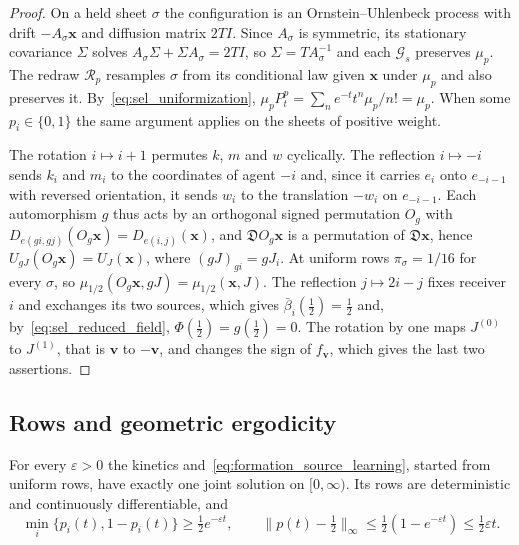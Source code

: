 \begin{proof}
On a held sheet $\sigma$ the configuration is an Ornstein--Uhlenbeck process with drift $-A_\sigma\mathbf x$ and diffusion matrix $2TI$. Since $A_\sigma$ is symmetric, its stationary covariance $\Sigma$ solves $A_\sigma\Sigma+\Sigma A_\sigma=2TI$, so $\Sigma=TA_\sigma^{-1}$ and each $\mathcal G_s$ preserves $\mu_p$. The redraw $\mathcal R_p$ resamples $\sigma$ from its conditional law given $\mathbf x$ under $\mu_p$ and also preserves it. By~\eqref{eq:sel_uniformization}, $\mu_pP^p_t=\sum_ne^{-t}t^n\mu_p/n!=\mu_p$. When some $p_i\in\{0,1\}$ the same argument applies on the sheets of positive weight.

The rotation $i\mapsto i+1$ permutes $k$, $m$ and $w$ cyclically. The reflection $i\mapsto-i$ sends $k_i$ and $m_i$ to the coordinates of agent $-i$ and, since it carries $e_i$ onto $e_{-i-1}$ with reversed orientation, it sends $w_i$ to the translation $-w_i$ on $e_{-i-1}$. Each automorphism $g$ thus acts by an orthogonal signed permutation $O_g$ with $D_{e(gi,gj)}(O_g\mathbf x)=D_{e(i,j)}(\mathbf x)$, and $\mathfrak DO_g\mathbf x$ is a permutation of $\mathfrak D\mathbf x$, hence $U_{gJ}(O_g\mathbf x)=U_J(\mathbf x)$, where $(gJ)_{gi}=gJ_i$. At uniform rows $\pi_\sigma=1/16$ for every $\sigma$, so $\mu_{1/2}(O_g\mathbf x,gJ)=\mu_{1/2}(\mathbf x,J)$. The reflection $j\mapsto2i-j$ fixes receiver $i$ and exchanges its two sources, which gives $\bar\beta_i(\frac12)=\frac12$ and, by~\eqref{eq:sel_reduced_field}, $\Phi(\frac12)=g(\frac12)=0$. The rotation by one maps $J^{(0)}$ to $J^{(1)}$, that is $\mathbf v$ to $-\mathbf v$, and changes the sign of $f_{\mathbf v}$, which gives the last two assertions.
\end{proof}

\subsection{Rows and geometric ergodicity}\label{app:sel_rows}

\begin{lemma}\label{lem:sel_rows}
For every $\varepsilon>0$ the kinetics and~\eqref{eq:formation_source_learning}, started from uniform rows, have exactly one joint solution on $[0,\infty)$. Its rows are deterministic and continuously differentiable, and
\begin{equation}
\min_i\{p_i(t),1-p_i(t)\}\ge\tfrac12e^{-\varepsilon t},\qquad
\|p(t)-\tfrac12\|_\infty\le\tfrac12(1-e^{-\varepsilon t})\le\tfrac12\varepsilon t.
\label{eq:sel_row_bounds}
\end{equation}
\end{lemma}

